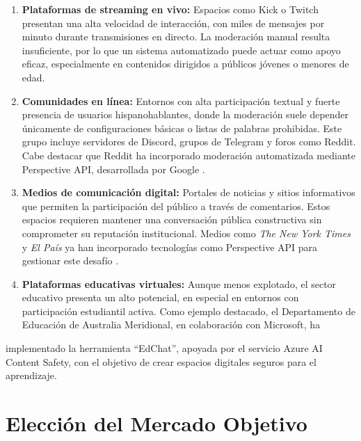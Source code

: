 \begin{enumerate}
    \item \textbf{Plataformas de streaming en vivo:} Espacios como Kick o Twitch presentan una alta velocidad de interacción, con miles de mensajes por minuto durante transmisiones en directo. La moderación manual resulta insuficiente, por lo que un sistema automatizado puede actuar como apoyo eficaz, especialmente en contenidos dirigidos a públicos jóvenes o menores de edad.

    \item \textbf{Comunidades en línea:} Entornos con alta participación textual y fuerte presencia de usuarios hispanohablantes, donde la moderación suele depender únicamente de configuraciones básicas o listas de palabras prohibidas. Este grupo incluye servidores de Discord, grupos de Telegram y foros como Reddit. Cabe destacar que Reddit ha incorporado moderación automatizada mediante Perspective API, desarrollada por Google \cite{perspective2025research}.

    \item \textbf{Medios de comunicación digital:} Portales de noticias y sitios informativos que permiten la participación del público a través de comentarios. Estos espacios requieren mantener una conversación pública constructiva sin comprometer su reputación institucional. Medios como \textit{The New York Times} y \textit{El País} ya han incorporado tecnologías como Perspective API para gestionar este desafío \cite{perspective2025research}.

    \item \textbf{Plataformas educativas virtuales:} Aunque menos explotado, el sector educativo presenta un alto potencial, en especial en entornos con participación estudiantil activa. Como ejemplo destacado, el Departamento de Educación de Australia Meridional, en colaboración con Microsoft, ha
\end{enumerate}







\vspace{0.5cm}

implementado la herramienta ``EdChat'', apoyada por el servicio Azure AI Content Safety, con el objetivo de crear espacios digitales seguros para el aprendizaje.

\section{Elección del Mercado Objetivo}

